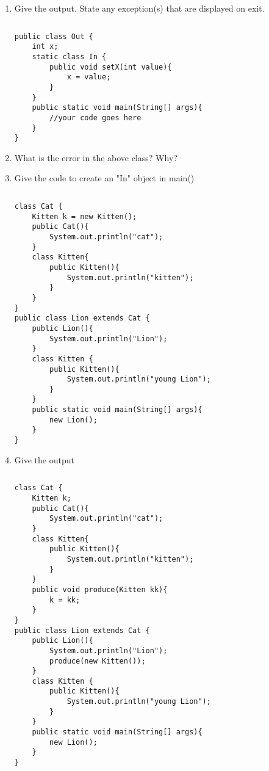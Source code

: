 \documentclass{article}
\begin{document}
\begin{enumerate}
\begin{lstlisting}
public class Test {
 	public void a() throws LanguageException{
  		throw new LanguageException();
 	}
 	public void b() throws JavaException{
  		throw new JavaException();
 	}
 	public static void main(String[] args){
  		Test t = new Test(); 
  		try{
   			t.a();
   			t.b();
  		}
  		catch(LanguageException l){}
  		catch(JavaException j){}
  		System.out.println("finished main");
 	}
}
\end{lstlisting}
	\item Give the output. State any exception(s) that are displayed on exit.
\begin{lstlisting}
\end{lstlisting}
\begin{lstlisting}
public class Out {
 	int x;
 	static class In {
  		public void setX(int value){
   			x = value;
  		}
 	}
 	public static void main(String[] args){
  		//your code goes here
 	}
}
\end{lstlisting}
	\item What is the error in the above class? Why? \newline
	\item Give the code to create an "In" object in main()
\begin{lstlisting}
\end{lstlisting}
	\newpage
\begin{lstlisting}
class Cat {
 	Kitten k = new Kitten();
 	public Cat(){
  		System.out.println("cat");
 	}
 	class Kitten{
  		public Kitten(){
   			System.out.println("kitten");
  		}
 	}
}
public class Lion extends Cat {
 	public Lion(){
  		System.out.println("Lion");
 	}
 	class Kitten {
  		public Kitten(){
   			System.out.println("young Lion");
  		}
 	}
 	public static void main(String[] args){
  		new Lion();
 	}
}
\end{lstlisting}
	\item Give the output
\begin{lstlisting}
\end{lstlisting}
\begin{lstlisting}
class Cat {
 	Kitten k;
 	public Cat(){
  		System.out.println("cat");
 	}
 	class Kitten{
  		public Kitten(){
   			System.out.println("kitten");
  		}
 	}
 	public void produce(Kitten kk){
   		k = kk;
 	}
}
public class Lion extends Cat {
 	public Lion(){
  		System.out.println("Lion");
  		produce(new Kitten());
 	}
 	class Kitten {
  		public Kitten(){
   			System.out.println("young Lion");
  		}
 	}
 	public static void main(String[] args){
  		new Lion();
 	}
}
\end{lstlisting}

\end{enumerate}
\end{document}
